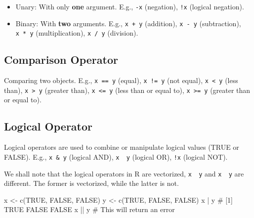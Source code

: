 \documentclass[
  letterpaper,
  DIV=11,
  numbers=noendperiod]{scrreprt}
\newenvironment{Shaded}{\begin{snugshade}}{\end{snugshade}}
\newcommand{\CommentTok}[1]{\textcolor[rgb]{0.37,0.37,0.37}{#1}}
\newcommand{\ConstantTok}[1]{\textcolor[rgb]{0.56,0.35,0.01}{#1}}
\newcommand{\FunctionTok}[1]{\textcolor[rgb]{0.28,0.35,0.67}{#1}}
\newcommand{\NormalTok}[1]{\textcolor[rgb]{0.00,0.23,0.31}{#1}}
\newcommand{\OtherTok}[1]{\textcolor[rgb]{0.00,0.23,0.31}{#1}}
\newcommand{\SpecialCharTok}[1]{\textcolor[rgb]{0.37,0.37,0.37}{#1}}
\begin{document}
\begin{itemize}
\item
  Unary: With only \textbf{one} argument. E.g., \texttt{-x} (negation),
  \texttt{!x} (logical negation).
\item
  Binary: With \textbf{two} arguments. E.g., \texttt{x\ +\ y}
  (addition), \texttt{x\ -\ y} (subtraction), \texttt{x\ *\ y}
  (multiplication), \texttt{x\ /\ y} (division).
\end{itemize}

\subsection{Comparison Operator}\label{comparison-operator}

Comparing two objects. E.g., \texttt{x\ ==\ y} (equal),
\texttt{x\ !=\ y} (not equal), \texttt{x\ \textless{}\ y} (less than),
\texttt{x\ \textgreater{}\ y} (greater than),
\texttt{x\ \textless{}=\ y} (less than or equal to),
\texttt{x\ \textgreater{}=\ y} (greater than or equal to).

\subsection{Logical Operator}\label{logical-operator}

Logical operators are used to combine or manipulate logical values (TRUE
or FALSE). E.g., \texttt{x\ \&\ y} (logical AND),
\texttt{x\ \textbar{}\ y} (logical OR), \texttt{!x} (logical NOT).

We shall note that the logical operators in R are vectorized,
\texttt{x\ \textbar{}\ y} and \texttt{x\ \textbar{}\textbar{}\ y} are
different. The former is vectorized, while the latter is not.

\begin{Shaded}
\begin{Highlighting}[]
\NormalTok{x }\OtherTok{\textless{}{-}} \FunctionTok{c}\NormalTok{(}\ConstantTok{TRUE}\NormalTok{, }\ConstantTok{FALSE}\NormalTok{, }\ConstantTok{FALSE}\NormalTok{)}
\NormalTok{y }\OtherTok{\textless{}{-}} \FunctionTok{c}\NormalTok{(}\ConstantTok{TRUE}\NormalTok{, }\ConstantTok{FALSE}\NormalTok{, }\ConstantTok{FALSE}\NormalTok{)}
\NormalTok{x }\SpecialCharTok{|}\NormalTok{ y  }\CommentTok{\# [1]  TRUE FALSE FALSE}
\NormalTok{x }\SpecialCharTok{||}\NormalTok{ y }\CommentTok{\# This will return an error}
\end{Highlighting}
\end{Shaded}
\end{document}
